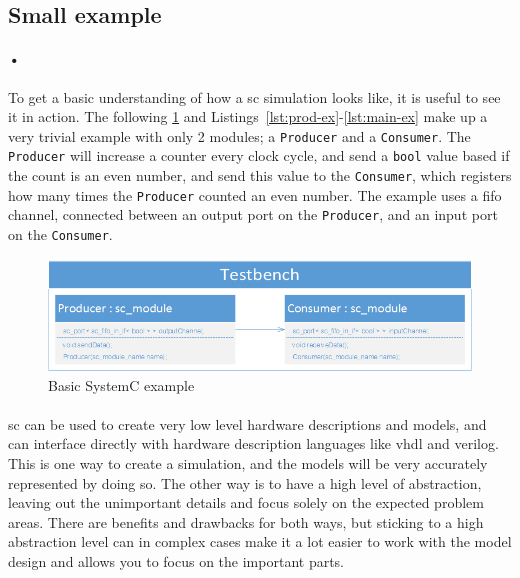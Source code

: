 \documentclass[a4paper, 12pt]{report}\dfrac{\right }{•}
\newcommand{\codeword}[1]{\texttt{#1}}
\begin{document}
\newpage
\subsection{Small example}

\paragraph{•}
To get a basic understanding of how a \gls{sc} simulation looks like, it is useful to see it in action.
The following \ref{fig:sc-ex} and Listings~\ref{lst:prod-ex}-\ref{lst:main-ex} make up a very trivial example with only 2 modules; a \codeword{Producer} and a \codeword{Consumer}.
The \codeword{Producer} will increase a counter every clock cycle, and send a \codeword{bool} value based if the count is an even number, and send this value to the \codeword{Consumer}, which registers how many times the \codeword{Producer} counted an even number.
The example uses a \gls{fifo} channel, connected between an output port on the \codeword{Producer}, and an input port on the \codeword{Consumer}.

\begin{figure}[h!]
  \centering
    \includegraphics[width=1.0\textwidth]{images/sc-example.png}
     \caption{Basic SystemC example}
    \label{fig:sc-ex}
\end{figure}

\noindent
\begin{minipage}{\linewidth}

\end{minipage}
\begin{minipage}{\linewidth}

\end{minipage}
\begin{minipage}{\linewidth}

\end{minipage}

\paragraph{}
\gls{sc} can be used to create very low level hardware descriptions and models, and can interface directly with hardware description languages like \gls{vhdl} and \gls{verilog}.
This is one way to create a simulation, and the models will be very accurately represented by doing so.
The other way is to have a high level of abstraction, leaving out the unimportant details and focus solely on the expected problem areas.
There are benefits and drawbacks for both ways, but sticking to a high abstraction level can in complex cases make it a lot easier to work with the model design and allows you to focus on the important parts.
\end{document}
